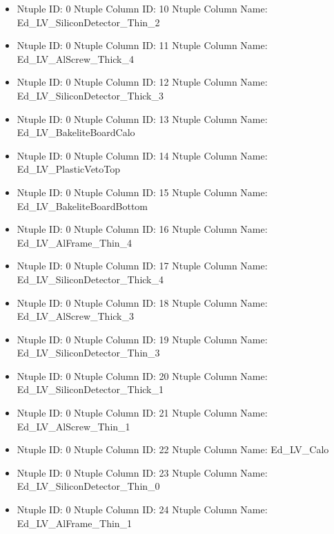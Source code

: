\documentclass[8pt]{beamer}
\begin{document}
\begin{frame}
\begin{itemize}
        \item Ntuple ID: 0 Ntuple Column ID: 10 Ntuple Column Name: Ed\_LV\_SiliconDetector\_Thin\_2
        
        \item Ntuple ID: 0 Ntuple Column ID: 11 Ntuple Column Name: Ed\_LV\_AlScrew\_Thick\_4
        
        \item Ntuple ID: 0 Ntuple Column ID: 12 Ntuple Column Name: Ed\_LV\_SiliconDetector\_Thick\_3
        
        \item Ntuple ID: 0 Ntuple Column ID: 13 Ntuple Column Name: Ed\_LV\_BakeliteBoardCalo
        
        \item Ntuple ID: 0 Ntuple Column ID: 14 Ntuple Column Name: Ed\_LV\_PlasticVetoTop
        
        \item Ntuple ID: 0 Ntuple Column ID: 15 Ntuple Column Name: Ed\_LV\_BakeliteBoardBottom
        
        \item Ntuple ID: 0 Ntuple Column ID: 16 Ntuple Column Name: Ed\_LV\_AlFrame\_Thin\_4
        
        \item Ntuple ID: 0 Ntuple Column ID: 17 Ntuple Column Name: Ed\_LV\_SiliconDetector\_Thick\_4
        
        \item Ntuple ID: 0 Ntuple Column ID: 18 Ntuple Column Name: Ed\_LV\_AlScrew\_Thick\_3
        
        \item Ntuple ID: 0 Ntuple Column ID: 19 Ntuple Column Name: Ed\_LV\_SiliconDetector\_Thin\_3
        
        \item Ntuple ID: 0 Ntuple Column ID: 20 Ntuple Column Name: Ed\_LV\_SiliconDetector\_Thick\_1
        
        \item Ntuple ID: 0 Ntuple Column ID: 21 Ntuple Column Name: Ed\_LV\_AlScrew\_Thin\_1
        
        \item Ntuple ID: 0 Ntuple Column ID: 22 Ntuple Column Name: Ed\_LV\_Calo
        
        \item Ntuple ID: 0 Ntuple Column ID: 23 Ntuple Column Name: Ed\_LV\_SiliconDetector\_Thin\_0
        
        \item Ntuple ID: 0 Ntuple Column ID: 24 Ntuple Column Name: Ed\_LV\_AlFrame\_Thin\_1
        

\end{itemize}
\end{frame}
\end{document}
